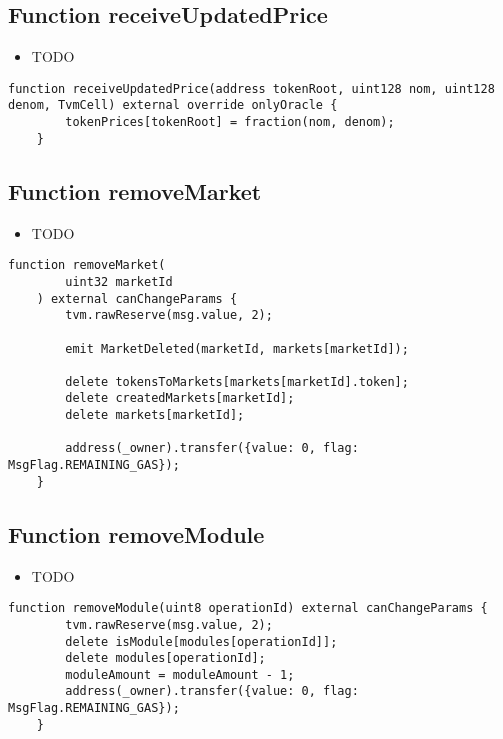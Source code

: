 \subsection{Function receiveUpdatedPrice}

\noindent\begin{itemize}
\item TODO
\end{itemize}

\begin{lstlisting}[firstnumber=440]
    function receiveUpdatedPrice(address tokenRoot, uint128 nom, uint128 denom, TvmCell) external override onlyOracle {
        tokenPrices[tokenRoot] = fraction(nom, denom);
    }
\end{lstlisting}

\subsection{Function removeMarket}

\noindent\begin{itemize}
\item TODO
\end{itemize}

\begin{lstlisting}[firstnumber=315]
    function removeMarket(
        uint32 marketId
    ) external canChangeParams {
        tvm.rawReserve(msg.value, 2);

        emit MarketDeleted(marketId, markets[marketId]);

        delete tokensToMarkets[markets[marketId].token];
        delete createdMarkets[marketId];
        delete markets[marketId];

        address(_owner).transfer({value: 0, flag: MsgFlag.REMAINING_GAS});
    }
\end{lstlisting}

\subsection{Function removeModule}

\noindent\begin{itemize}
\item TODO
\end{itemize}

\begin{lstlisting}[firstnumber=342]
    function removeModule(uint8 operationId) external canChangeParams {
        tvm.rawReserve(msg.value, 2);
        delete isModule[modules[operationId]];
        delete modules[operationId];
        moduleAmount = moduleAmount - 1;
        address(_owner).transfer({value: 0, flag: MsgFlag.REMAINING_GAS});
    }
\end{lstlisting}

